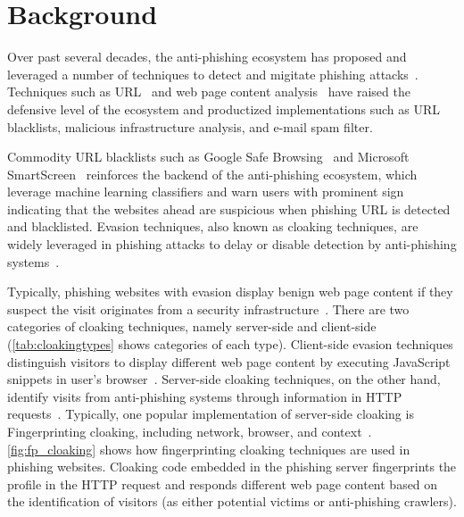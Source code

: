 \section{Background}
\label{s:background}

\cloakingTypes



Over past several decades, the anti-phishing ecosystem has proposed and leveraged a number of techniques to detect and migitate phishing attacks~\cite{oest2018inside}.
Techniques such as URL~\cite{bin2010dns, blum2010lexical, huang2012svm, khonji2011novel} and web page content analysis~\cite{wu2006web, zhang2007cantina, zhang2011textual, bilge2011exposure, canali2013role} have raised the defensive level of the ecosystem and productized implementations such as URL blacklists, malicious infrastructure analysis, and e-mail spam filter.

Commodity URL blacklists such as Google Safe Browsing~\cite{whittaker2010large} and Microsoft SmartScreen~\cite{smartscreen} reinforces the backend of the anti-phishing ecosystem, which leverage machine learning classifiers and warn users with prominent sign indicating that the websites ahead are suspicious when phishing URL is detected and blacklisted.
Evasion techniques, also known as cloaking techniques, are widely leveraged in phishing attacks to delay or disable detection by anti-phishing systems~\cite{liang2016cracking, oest2019phishfarm, oest2020phishtime}.



Typically, phishing websites with evasion display benign web page content if they suspect the visit originates from a security infrastructure~\cite{wu2005cloaking}.
There are two categories of cloaking techniques, namely server-side and client-side (\autoref{tab:cloakingtypes} shows categories of each type).
Client-side evasion techniques distinguish visitors to display different web page content by executing JavaScript snippets in user's browser~\cite{zhang2021crawlphish}.
Server-side cloaking techniques, on the other hand, identify visits from anti-phishing systems through information in HTTP requests~\cite{oest2018inside, invernizzi2016cloak}.
Typically, 
one popular implementation of server-side cloaking is Fingerprinting cloaking,
including network, browser, and context~\cite{invernizzi2016cloak, oest2018inside}.
\autoref{fig:fp_cloaking} shows how fingerprinting cloaking techniques are used in phishing websites.
Cloaking code embedded in the phishing server fingerprints the profile in the HTTP request and responds different web page content based on the identification of visitors (as either potential victims or anti-phishing crawlers).

